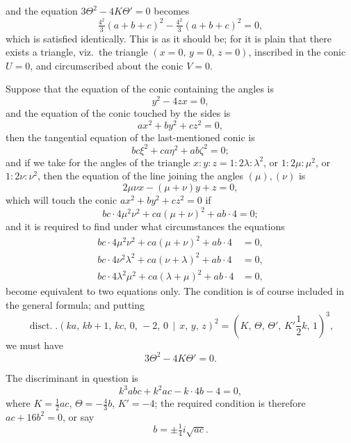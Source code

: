 \documentclass[12pt,a4paper]{article}
\providecommand{\disct}{\mathop{\mathrm{disct.}}}
\theoremstyle{plain}
\begin{document}
\noindent and the equation $3\Theta^2-4K\Theta'=0$ becomes
\[
\tfrac{4^2}{3}(a+b+c)^2-\tfrac{4^2}{3}(a+b+c)^2=0,
\]
which is satisfied identically. This is as it should be; for it is plain that there exists a triangle, viz.\ the triangle $(x=0,\,y=0,\,z=0)$, inscribed in the conic $U=0$, and circumscribed about the conic $V=0$.

\medskip

Suppose that the equation of the conic containing the angles is
\[
y^2-4zx=0,
\]
and the equation of the conic touched by the sides is
\[
ax^2+by^2+cz^2=0,
\]
then the tangential equation of the last-mentioned conic is
\[
bc\xi^2+ca\eta^2+ab\zeta^2=0;
\]
and if we take for the angles of the triangle $x:y:z=1:2\lambda:\lambda^2$, or $1:2\mu:\mu^2$, or $1:2\nu:\nu^2$, then the equation of the line joining the angles $(\mu),(\nu)$ is
\[
2\mu\nu x-(\mu+\nu)y+z=0,
\]
which will touch the conic $ax^2+by^2+cz^2=0$ if
\[
bc\cdot 4\mu^2\nu^2+ca(\mu+\nu)^2+ab\cdot 4=0;
\]
and it is required to find under what circumstances the equations
\begin{align*}
bc\cdot 4\mu^2\nu^2+ca(\mu+\nu)^2+ab\cdot 4&=0,\\
bc\cdot 4\nu^2\lambda^2+ca(\nu+\lambda)^2+ab\cdot 4&=0,\\
bc\cdot 4\lambda^2\mu^2+ca(\lambda+\mu)^2+ab\cdot 4&=0,
\end{align*}
become equivalent to two equations only. The condition is of course included in the general formula; and putting
\[
\disct.(ka,\,kb+1,\,kc,\,0,\,-2,\,0\,\mid\,x,\,y,\,z)^2=(K,\,\Theta,\,\Theta',\,K'\!\textstyle\frac{1}{2}k,\,1)^3,
\]
we must have
\[
3\Theta^2-4K\Theta'=0.
\]

The discriminant in question is
\[
k^3 abc+k^2ac-k\cdot 4b-4=0,
\]
where $K=\frac{1}{2}ac$, $\Theta=-\frac{4}{3}b$, $K'=-4$; the required condition is therefore $ac+16b^2=0$, or say
\[
b=\pm\tfrac{1}{4}i\sqrt{ac}.
\]

\bigskip
\end{document}
